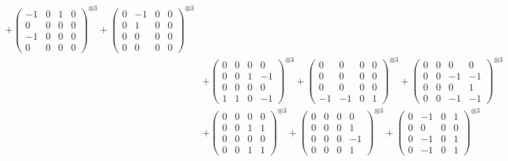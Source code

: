\documentclass{article}
\begin{document}
{\begin{align}
            + \begin{pmatrix} -1 & 0 & 1 & 0 \\ 0 & 0 & 0 & 0 \\ -1 & 0 & 0 & 0 \\ 0 & 0 & 0 & 0 \end{pmatrix}^{\otimes 3} 
            + \begin{pmatrix} 0 & -1 & 0 & 0 \\ 0 & 1 & 0 & 0 \\ 0 & 0 & 0 & 0 \\ 0 & 0 & 0 & 0 \end{pmatrix}^{\otimes 3} \\
        &+ \label{Rs16-Rc11-Solution-24-c10} \begin{pmatrix} 0 & 0 & 0 & 0 \\ 0 & 0 & 1 & -1 \\ 0 & 0 & 0 & 0 \\ 1 & 1 & 0 & -1 \end{pmatrix}^{\otimes 3} 
            + \begin{pmatrix} 0 & 0 & 0 & 0 \\ 0 & 0 & 0 & 0 \\ 0 & 0 & 0 & 0 \\ -1 & -1 & 0 & 1 \end{pmatrix}^{\otimes 3} 
            + \begin{pmatrix} 0 & 0 & 0 & 0 \\ 0 & 0 & -1 & -1 \\ 0 & 0 & 0 & 1 \\ 0 & 0 & -1 & -1 \end{pmatrix}^{\otimes 3} \\
        &+ \label{Rs16-Rc11-Solution-24-c13} \begin{pmatrix} 0 & 0 & 0 & 0 \\ 0 & 0 & 1 & 1 \\ 0 & 0 & 0 & 0 \\ 0 & 0 & 1 & 1 \end{pmatrix}^{\otimes 3} 
            + \begin{pmatrix} 0 & 0 & 0 & 0 \\ 0 & 0 & 0 & 1 \\ 0 & 0 & 0 & -1 \\ 0 & 0 & 0 & 1 \end{pmatrix}^{\otimes 3} 
            + \begin{pmatrix} 0 & -1 & 0 & 1 \\ 0 & 0 & 0 & 0 \\ 0 & -1 & 0 & 1 \\ 0 & -1 & 0 & 1 \end{pmatrix}^{\otimes 3} \\

\end{align}}
\end{document}
